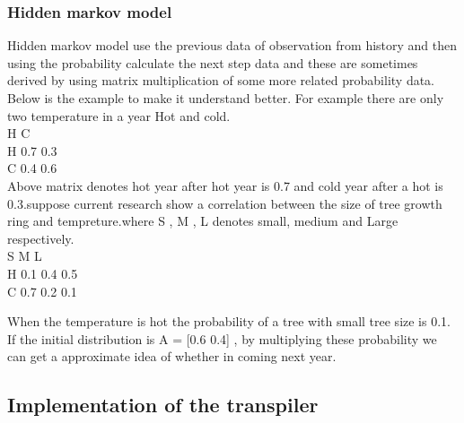 \documentclass[23pt]{article}
\begin{document}
\subsubsection{Hidden markov model}

{\Large Hidden markov model use the previous data of observation from history and then using the probability calculate the next step data and these are sometimes derived by using matrix multiplication of some more related probability data. Below is the example to make it understand better. For example there are only two temperature in a year Hot and cold. \\ 
                      \hspace*{0.1in}  H   \hspace*{0.1in}   C \\
                              H   0.7  0.3 \\
                              C  0.4 0.6   \\

Above matrix denotes hot year after hot year is 0.7 and cold year after a hot is 0.3.suppose current research show a correlation between the size of tree growth ring and tempreture.where S , M , L denotes small, medium and Large respectively. \\

                           \hspace*{0.1in}   S  \hspace*{0.1in}    M  \hspace*{0.1in}   L \\
                               H  0.1  0.4  0.5 \\
                               C  0.7  0.2  0.1 
\\   \par}

{\Large When the temperature is hot the probability of a tree with small tree size is 0.1.
If the initial distribution is A = [0.6 0.4] , by multiplying these probability we can get a approximate idea of whether in coming next year. \par}

\subsection{Implementation of the transpiler}
\end{document}
